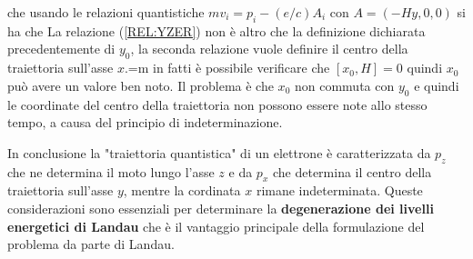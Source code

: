 che usando le relazioni quantistiche $mv_i = p_i -(e/c)A_i$ con $A=(-Hy,0,0)$ si ha che
La relazione (\ref{REL:YZER}) non \`e altro che la definizione dichiarata precedentemente di $y_0$, la seconda relazione vuole definire il centro della traiettoria sull'asse $x$.=m in fatti \`e possibile verificare che $[x_0,H]=0$ quindi $x_0$ pu\`o avere un valore ben noto. Il problema \`e che $x_0$ non commuta con $y_0$ e quindi le coordinate del centro della traiettoria non possono essere note allo stesso tempo, a causa del principio di indeterminazione.

In conclusione la "traiettoria quantistica" di un elettrone \`e caratterizzata da $p_z$ che ne determina il moto  lungo l'asse $z$ e da $p_x$ che determina il centro della traiettoria sull'asse $y$, mentre la cordinata $x$ rimane indeterminata. Queste considerazioni sono essenziali per determinare la \textbf{degenerazione dei livelli energetici di Landau} che \`e il vantaggio principale della formulazione del problema da parte di Landau.

